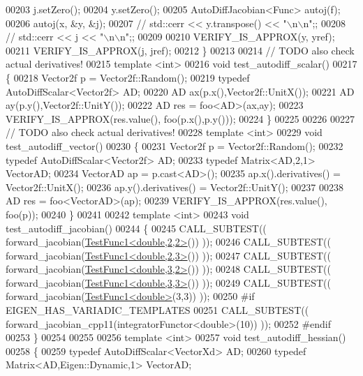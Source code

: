 \begin{DoxyCode}
00203     j.setZero();
00204     y.setZero();
00205     AutoDiffJacobian<Func> autoj(f);
00206     autoj(x, &y, &j);
00207 \textcolor{comment}{//     std::cerr << y.transpose() << "\(\backslash\)n\(\backslash\)n";;}
00208 \textcolor{comment}{//     std::cerr << j << "\(\backslash\)n\(\backslash\)n";;}
00209 
00210     VERIFY\_IS\_APPROX(y, yref);
00211     VERIFY\_IS\_APPROX(j, jref);
00212 \}
00213 
00214 \textcolor{comment}{// TODO also check actual derivatives!}
00215 \textcolor{keyword}{template} <\textcolor{keywordtype}{int}>
00216 \textcolor{keywordtype}{void} test\_autodiff\_scalar()
00217 \{
00218   Vector2f p = Vector2f::Random();
00219   \textcolor{keyword}{typedef} AutoDiffScalar<Vector2f> AD;
00220   AD ax(p.x(),Vector2f::UnitX());
00221   AD ay(p.y(),Vector2f::UnitY());
00222   AD res = foo<AD>(ax,ay);
00223   VERIFY\_IS\_APPROX(res.value(), foo(p.x(),p.y()));
00224 \}
00225 
00226 
00227 \textcolor{comment}{// TODO also check actual derivatives!}
00228 \textcolor{keyword}{template} <\textcolor{keywordtype}{int}>
00229 \textcolor{keywordtype}{void} test\_autodiff\_vector()
00230 \{
00231   Vector2f p = Vector2f::Random();
00232   \textcolor{keyword}{typedef} AutoDiffScalar<Vector2f> AD;
00233   \textcolor{keyword}{typedef} Matrix<AD,2,1> VectorAD;
00234   VectorAD ap = p.cast<AD>();
00235   ap.x().derivatives() = Vector2f::UnitX();
00236   ap.y().derivatives() = Vector2f::UnitY();
00237 
00238   AD res = foo<VectorAD>(ap);
00239   VERIFY\_IS\_APPROX(res.value(), foo(p));
00240 \}
00241 
00242 \textcolor{keyword}{template} <\textcolor{keywordtype}{int}>
00243 \textcolor{keywordtype}{void} test\_autodiff\_jacobian()
00244 \{
00245   CALL\_SUBTEST(( forward\_jacobian(\hyperlink{struct_test_func1}{TestFunc1<double,2,2>}()) ));
00246   CALL\_SUBTEST(( forward\_jacobian(\hyperlink{struct_test_func1}{TestFunc1<double,2,3>}()) ));
00247   CALL\_SUBTEST(( forward\_jacobian(\hyperlink{struct_test_func1}{TestFunc1<double,3,2>}()) ));
00248   CALL\_SUBTEST(( forward\_jacobian(\hyperlink{struct_test_func1}{TestFunc1<double,3,3>}()) ));
00249   CALL\_SUBTEST(( forward\_jacobian(\hyperlink{struct_test_func1}{TestFunc1<double>}(3,3)) ));
00250 \textcolor{preprocessor}{#if EIGEN\_HAS\_VARIADIC\_TEMPLATES}
00251   CALL\_SUBTEST(( forward\_jacobian\_cpp11(integratorFunctor<double>(10)) ));
00252 \textcolor{preprocessor}{#endif}
00253 \}
00254 
00255 
00256 \textcolor{keyword}{template} <\textcolor{keywordtype}{int}>
00257 \textcolor{keywordtype}{void} test\_autodiff\_hessian()
00258 \{
00259   \textcolor{keyword}{typedef} AutoDiffScalar<VectorXd> AD;
00260   \textcolor{keyword}{typedef} Matrix<AD,Eigen::Dynamic,1> VectorAD;

\end{DoxyCode}
